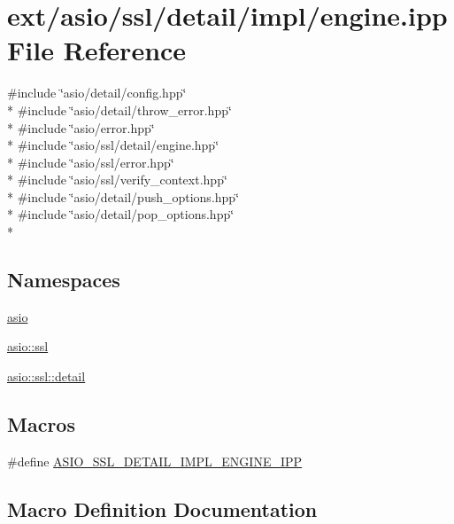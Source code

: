 \hypertarget{engine_8ipp}{}\section{ext/asio/ssl/detail/impl/engine.ipp File Reference}
\label{engine_8ipp}
{\ttfamily \#include \char`\"{}asio/detail/config.\+hpp\char`\"{}}\\*
{\ttfamily \#include \char`\"{}asio/detail/throw\+\_\+error.\+hpp\char`\"{}}\\*
{\ttfamily \#include \char`\"{}asio/error.\+hpp\char`\"{}}\\*
{\ttfamily \#include \char`\"{}asio/ssl/detail/engine.\+hpp\char`\"{}}\\*
{\ttfamily \#include \char`\"{}asio/ssl/error.\+hpp\char`\"{}}\\*
{\ttfamily \#include \char`\"{}asio/ssl/verify\+\_\+context.\+hpp\char`\"{}}\\*
{\ttfamily \#include \char`\"{}asio/detail/push\+\_\+options.\+hpp\char`\"{}}\\*
{\ttfamily \#include \char`\"{}asio/detail/pop\+\_\+options.\+hpp\char`\"{}}\\*
\subsection*{Namespaces}
\begin{DoxyCompactItemize}
\item 
 \hyperlink{namespaceasio}{asio}
\item 
 \hyperlink{namespaceasio_1_1ssl}{asio\+::ssl}
\item 
 \hyperlink{namespaceasio_1_1ssl_1_1detail}{asio\+::ssl\+::detail}
\end{DoxyCompactItemize}
\subsection*{Macros}
\begin{DoxyCompactItemize}
\item 
\#define \hyperlink{engine_8ipp_a7420a9c454ba8ae736e1c326ce49c86a}{A\+S\+I\+O\+\_\+\+S\+S\+L\+\_\+\+D\+E\+T\+A\+I\+L\+\_\+\+I\+M\+P\+L\+\_\+\+E\+N\+G\+I\+N\+E\+\_\+\+I\+P\+P}
\end{DoxyCompactItemize}


\subsection{Macro Definition Documentation}
\hypertarget{engine_8ipp_a7420a9c454ba8ae736e1c326ce49c86a}{}
